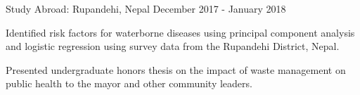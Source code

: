 \begin{cventries}
    \cventry
{Study Abroad: Rupandehi, Nepal} %
{}
{} %
{December 2017 - January 2018} %
{
\begin{cvitems} %
\item Identified risk factors for waterborne diseases using principal component analysis and logistic regression \newline using survey data from the Rupandehi District, Nepal.
\item Presented undergraduate honors thesis on the impact of waste management on public health to the \newline mayor and other community leaders.
  \end{cvitems}
}


\end{cventries}
